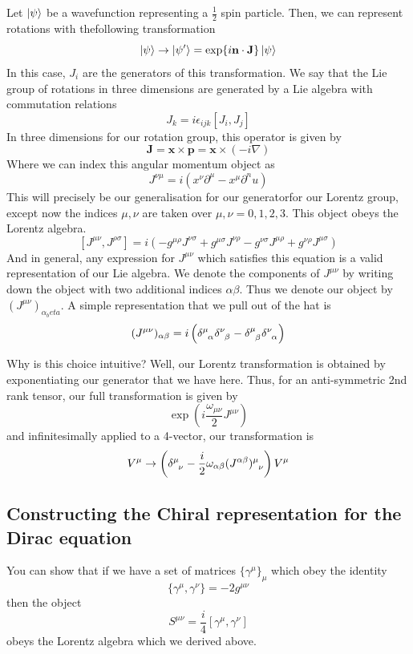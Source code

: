 \documentclass[11pt, oneside]{article}   	%
\theoremstyle{newline}
\theoremstyle{newline}
\theoremstyle{newline}
\theoremstyle{newline}
\theoremstyle{newline}
\begin{document}
Let $\ket{\psi}$ be a wavefunction representing a $\frac{1}{2}$ spin particle. Then, we can represent rotations with thefollowing transformation \[ \ket{\psi} \rightarrow \ket{\psi '}  = \exp{i \mathbf{n} \cdot \mathbf{J}} \ket{\psi} \]
In this case, $J_i$ are the generators of this transformation. We say that the Lie group of rotations in three dimensions are generated by a Lie algebra with commutation relations 
\[ J_k  = i \epsilon_{ijk} [J_i, J_j] \]   
In three dimensions for our rotation group, this operator is given by 
\[ \mathbf{J}  = \mathbf{x} \times \mathbf{p} = \mathbf{x} \times ( - i \nabla) \] 
Where we can index this angular momentum object as 
\[ J^{\nu \mu} = i (x^{\nu} \partial^\mu  - x^\mu \partial^nu) \]
This will precisely be our generalisation for our generatorfor our Lorentz group, except now the indices $\mu, \nu$ are taken over $\mu, \nu = 0, 1, 2, 3$. This object obeys the Lorentz algebra.
\[ [J^{\mu \nu}, J^{\rho \sigma}] = i( - g^{\mu \rho} J^{\nu \sigma} + g^{\mu \sigma}J^{\nu \rho}  - g^{\nu \sigma}J^{\mu \rho} + g^{\nu \rho}J^{\mu \sigma}) \]
And in general, any expression for $J^{\mu \nu}$ which satisfies this equation is a valid representation of our Lie algebra. We denote the components of $J^{\mu \nu}$ by writing down the object with two additional indices $\alpha \beta$. Thus we denote our object by $(J^{\mu \nu})_{\alpha_beta}$. A simple representation that we pull out of the hat is \[ (J^{\mu \nu})_{\alpha \beta} = i \left( \delta\indices{^\mu_\alpha} \delta\indices{^\nu_\beta}  - \delta\indices{^\mu_\beta}\delta\indices{^\nu_\alpha} \right) \] 

Why is this choice intuitive? Well, our Lorentz transformation is obtained by exponentiating our generator that we have here. Thus, for an anti-symmetric 2nd rank tensor, our full transformation is given by 
\[ 
\exp(i \frac{\omega_{\mu \nu}}{2} J^{\mu \nu})
\]
and infinitesimally applied to a 4-vector, our transformation is \[ V^\mu \rightarrow \left( \delta\indices{^\mu_\nu} - \frac{i}{2} \omega_{\alpha\beta}(J^{\alpha\beta})\indices{^\mu_\nu} \right) V^\mu \]

\subsection{Constructing the Chiral representation for the Dirac equation}
You can show that if we have a set of matrices $\{ \gamma^\mu \}_\mu$ which obey the identity 
\[ \{ \gamma^\mu , \gamma^\nu \} =  - 2 g^{\mu\nu}  \] then the object 
\[ S^{ \mu \nu } = \frac{i}{4} [\gamma^\mu, \gamma^\nu] \] obeys the Lorentz algebra which we derived above.  
\end{document}
